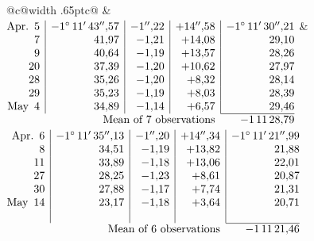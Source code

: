 \noindent\begin{tabular}{@{}c@{\hspace{.4em}\vrule width .65pt\hspace{.4em}}c@{}}
 &
 \\[.18ex]
\(\begin{array}[t]{@{}r|r|r|r|r@{}}
\text{Apr.}\enspace 5 & -1^\circ\,11'\,43''{,}57 & -1''{,}22 & +14''{,}58 & -1^\circ\,11'\,30''{,}21\\
7 & 41{,}97 & -1{,}21 & +14{,}08 & 29{,}10\\
9 & 40{,}64 & -1{,}19 & +13{,}57 & 28{,}26\\
20 & 37{,}39 & -1{,}20 & +10{,}62 & 27{,}97\\
28 & 35{,}26 & -1{,}20 & +8{,}32 & 28{,}14\\
29 & 35{,}23 & -1{,}19 & +8{,}03 & 28{,}39\\
\text{May}\enspace 4 & 34{,}89 & -1{,}14 & +6{,}57 & 29{,}46\\
\cline{5-5}
\multicolumn{4}{r}{\text{Mean of 7 observations}} & -1\,11\,28{,}79
\end{array}\)
&
\(\begin{array}[t]{@{}r|r|r|r|r@{}}
\text{Apr.}\enspace 6 & -1^\circ\,11'\,35''{,}13 & -1''{,}20 & +14''{,}34 & -1^\circ\,11'\,21''{,}99\\
8 & 34{,}51 & -1{,}19 & +13{,}82 & 21{,}88\\
11 & 33{,}89 & -1{,}18 & +13{,}06 & 22{,}01\\
27 & 28{,}25 & -1{,}23 & +8{,}61 & 20{,}87\\
30 & 27{,}88 & -1{,}17 & +7{,}74 & 21{,}31\\
\text{May}\enspace 14 & 23{,}17 & -1{,}18 & +3{,}64 & 20{,}71\\
 & & & & \\
\cline{5-5}
\multicolumn{4}{r}{\text{Mean of 6 observations}} & -1\,11\,21{,}46
\end{array}\)
\end{tabular}\par\medskip
